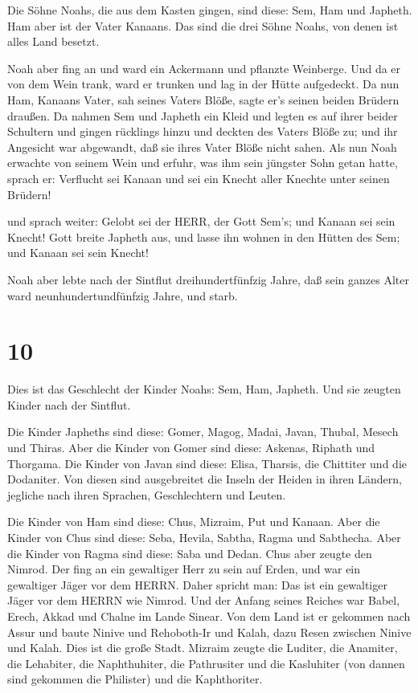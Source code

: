  Die Söhne Noahs, die aus dem Kasten gingen, sind diese:
Sem, Ham und Japheth. Ham aber ist der Vater Kanaans.  Das
sind die drei Söhne Noahs, von denen ist alles Land besetzt.

 Noah aber fing an und ward ein Ackermann und pflanzte
Weinberge.  Und da er von dem Wein trank, ward er trunken
und lag in der Hütte aufgedeckt.  Da nun Ham, Kanaans
Vater, sah seines Vaters Blöße, sagte er's seinen beiden Brüdern
draußen.  Da nahmen Sem und Japheth ein Kleid und legten es
auf ihrer beider Schultern und gingen rücklings hinzu und deckten des
Vaters Blöße zu; und ihr Angesicht war abgewandt, daß sie ihres Vater
Blöße nicht sahen.  Als nun Noah erwachte von seinem Wein
und erfuhr, was ihm sein jüngster Sohn getan hatte,  sprach
er: Verflucht sei Kanaan und sei ein Knecht aller Knechte unter seinen
Brüdern!

 und sprach weiter: Gelobt sei der HERR, der Gott Sem's;
und Kanaan sei sein Knecht!  Gott breite Japheth aus, und
lasse ihn wohnen in den Hütten des Sem; und Kanaan sei sein Knecht!

 Noah aber lebte nach der Sintflut dreihundertfünfzig
Jahre,  daß sein ganzes Alter ward neunhundertundfünfzig
Jahre, und starb.

\hypertarget{section-9}{%
\section{10}\label{section-9}}

 Dies ist das Geschlecht der Kinder Noahs: Sem, Ham,
Japheth. Und sie zeugten Kinder nach der Sintflut.

 Die Kinder Japheths sind diese: Gomer, Magog, Madai, Javan,
Thubal, Mesech und Thiras.  Aber die Kinder von Gomer sind
diese: Askenas, Riphath und Thorgama.  Die Kinder von Javan
sind diese: Elisa, Tharsis, die Chittiter und die Dodaniter.
 Von diesen sind ausgebreitet die Inseln der Heiden in ihren
Ländern, jegliche nach ihren Sprachen, Geschlechtern und Leuten.

 Die Kinder von Ham sind diese: Chus, Mizraim, Put und
Kanaan.  Aber die Kinder von Chus sind diese: Seba, Hevila,
Sabtha, Ragma und Sabthecha. Aber die Kinder von Ragma sind diese: Saba
und Dedan.  Chus aber zeugte den Nimrod. Der fing an ein
gewaltiger Herr zu sein auf Erden,  und war ein gewaltiger
Jäger vor dem HERRN. Daher spricht man: Das ist ein gewaltiger Jäger vor
dem HERRN wie Nimrod.  Und der Anfang seines Reiches war
Babel, Erech, Akkad und Chalne im Lande Sinear.  Von dem
Land ist er gekommen nach Assur und baute Ninive und Rehoboth-Ir und
Kalah,  dazu Resen zwischen Ninive und Kalah. Dies ist die
große Stadt.  Mizraim zeugte die Luditer, die Anamiter, die
Lehabiter, die Naphthuhiter,  die Pathrusiter und die
Kasluhiter (von dannen sind gekommen die Philister) und die
Kaphthoriter.

